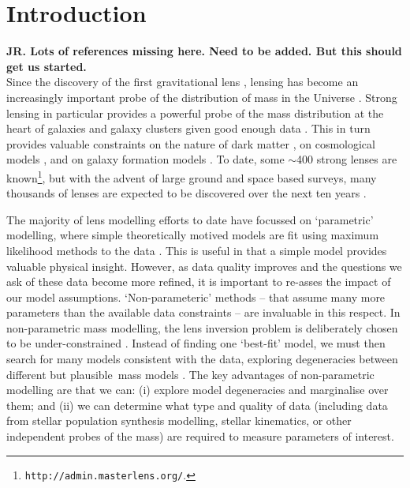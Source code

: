 \documentclass[galley]{mn2e}
\begin{document}
\section{Introduction}\label{sec:intro} %

{\bf JR. Lots of references missing here. Need to be added. But this should get us started.}\\

Since the discovery of the first gravitational lens \citep{1979Natur.279..381W}, lensing has become an increasingly important probe of the distribution of mass in the Universe \citep{1937ApJ....86..217Z,2012arXiv1206.1225A}. Strong lensing in particular provides a powerful probe of the mass distribution at the heart of galaxies and galaxy clusters given good enough data \citep{2010CQGra..27w3001B,2007ApJ...667..645R,2006ApJ...652L...5S,2009ApJ...690..154S}. This in turn provides valuable constraints on the nature of dark matter \citep{2006ApJ...652L...5S,2013ApJ...765...25N}, on cosmological models \citep{2010Sci...329..924J, 2008ApJ...679...17C}, and on galaxy formation models \citep{2012MNRAS.424..104L}. To date, some $\sim$400 strong lenses are known\footnote{{\tt http://admin.masterlens.org/}.}, but with the advent of large ground and space based surveys, many thousands of lenses are expected to be discovered over the next ten years \citep{2012arXiv1206.1225A, 2010AAS...21540115M, 2004NewAR..48.1085K}.

The majority of lens modelling efforts to date have focussed on `parametric' modelling, where simple theoretically motived models are fit using maximum likelihood methods to the data \citep{2011A&ARv..19...47K, 1993A&A...273..367K, 2010GReGr..42.2151K}. This is useful in that a simple model provides valuable physical insight. However, as data quality improves and the questions we ask of these data become more refined, it is important to re-asses the impact of our model assumptions. `Non-parameteric' methods -- that assume many more parameters than the available data constraints -- are invaluable in this respect. In non-parametric mass modelling, the lens inversion problem is deliberately chosen to be under-constrained \citep{1997MNRAS.292..148S,2005MNRAS.360..477D,2010ApJ...723.1678C,2006MNRAS.367.1209L,2013arXiv1304.2393S}. Instead of finding one `best-fit' model, we must then search for many models consistent with the data, exploring degeneracies between different but plausible\footnotemark\ mass models \citep{2000AJ....120.1654S,2006ApJ...653..936S,2008MNRAS.386..307L}. The key advantages of non-parametric modelling are that we can: (i) explore model degeneracies and marginalise over them; and (ii) we can determine what type and quality of data (including data from stellar population synthesis modelling, stellar kinematics, or other independent probes of the mass) are required to measure parameters of interest. 
\end{document}
